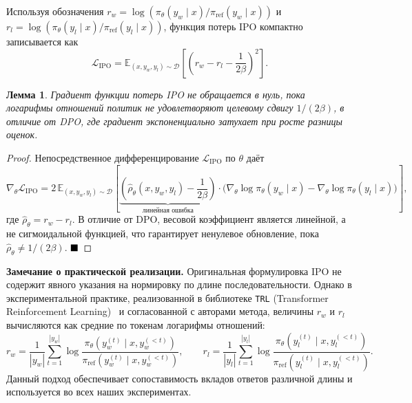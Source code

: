 \documentclass[a4paper,12pt]{article}
\newtheorem{lemma}{Лемма}
\begin{document}
Используя обозначения $r_w = \log (\pi_\theta(y_w \mid x) / \pi_{\text{ref}}(y_w \mid x))$ и $r_l = \log (\pi_\theta(y_l \mid x) / \pi_{\text{ref}}(y_l \mid x))$, функция потерь IPO компактно записывается как
\[
\mathcal{L}_{\text{IPO}} = \mathbb{E}_{(x, y_w, y_l) \sim \mathcal{D}} \left[ \left( r_w - r_l - \frac{1}{2\beta} \right)^2 \right].
\]

\begin{lemma} Градиент функции потерь IPO не обращается в нуль, пока логарифмы отношений политик не удовлетворяют целевому сдвигу $1/(2\beta)$, в отличие от DPO, где градиент экспоненциально затухает при росте разницы оценок. 
\end{lemma}

\begin{proof} Непосредственное дифференцирование $\mathcal{L}_{\text{IPO}}$ по $\theta$ даёт
\[
\nabla_\theta \mathcal{L}_{\text{IPO}} = 2\, \mathbb{E}_{(x, y_w, y_l) \sim \mathcal{D}} \left[ \underbrace{\left( \hat{\rho}_\theta(x, y_w, y_l) - \frac{1}{2\beta} \right)}_{\text{линейная ошибка}} \cdot \bigl( \nabla_\theta \log \pi_\theta(y_w \mid x) - \nabla_\theta \log \pi_\theta(y_l \mid x) \bigr) \right],
\]
где $\hat{\rho}_\theta = r_w - r_l$. В отличие от DPO, весовой коэффициент является линейной, а не сигмоидальной функцией, что гарантирует ненулевое обновление, пока $\hat{\rho}_\theta \neq 1/(2\beta)$. $\hfill\blacksquare$
\end{proof}

\textbf{Замечание о практической реализации.} Оригинальная формулировка IPO не содержит явного указания на нормировку по длине последовательности. Однако в экспериментальной практике, реализованной в библиотеке \texttt{TRL} (Transformer Reinforcement Learning)~\cite{vonwerra2022trl} и согласованной с авторами метода, величины $r_w$ и $r_l$ вычисляются как средние по токенам логарифмы отношений:
\[
r_w = \frac{1}{|y_w|}\sum_{t=1}^{|y_w|} \log \frac{\pi_\theta(y_w^{(t)} \mid x, y_w^{(<t)})}{\pi_{\text{ref}}(y_w^{(t)} \mid x, y_w^{(<t)})}, \qquad
r_l = \frac{1}{|y_l|}\sum_{t=1}^{|y_l|} \log \frac{\pi_\theta(y_l^{(t)} \mid x, y_l^{(<t)})}{\pi_{\text{ref}}(y_l^{(t)} \mid x, y_l^{(<t)})}.
\]
Данный подход обеспечивает сопоставимость вкладов ответов различной длины и используется во всех наших экспериментах.
\end{document}
